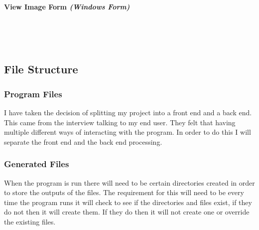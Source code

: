 \begin{FlushLeft}
    \bk

    \paragraph*{View Image Form \textit{(Windows Form)}} \mbox{} \\

    \begin{figure}[H]
        \centering
    \end{figure}\\

    \BK

    \subsection{File Structure}
    \subsubsection{Program Files}
    I have taken the decision of splitting my project into a front end and a back end. This came from the interview talking to my end user. They felt that having multiple different ways of interacting with the program. In order to do this I will separate the front end and the back end processing. 

    \bk

    \subsubsection{Generated Files}
    When the program is run there will need to be certain directories created in order to store the outputs of the files. The requirement for this will need to be every time the program runs it will check to see if the directories and files exist, if they do not then it will create them. If they do then it will not create one or override the existing files. \\ \bk


\end{FlushLeft}

